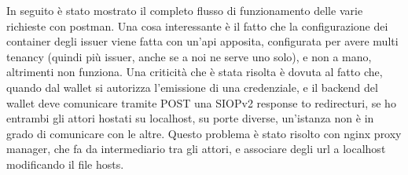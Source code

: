 In seguito è stato mostrato il completo flusso di funzionamento delle varie richieste con postman. Una cosa interessante è il fatto che la configurazione dei container degli issuer viene fatta con un'api apposita, configurata per avere multi tenancy (quindi più issuer, anche se a noi ne serve uno solo), e non a mano, altrimenti non funziona.
Una criticità che è stata risolta è dovuta al fatto che, quando dal wallet si autorizza l'emissione di una credenziale, e il backend del wallet deve comunicare tramite POST una SIOPv2 response to redirecturi, se ho entrambi gli attori hostati su localhost, su porte diverse, un'istanza non è in grado di comunicare con le altre.
Questo problema è stato risolto con nginx proxy manager, che fa da intermediario tra gli attori, e associare degli url a localhost modificando il file hosts.